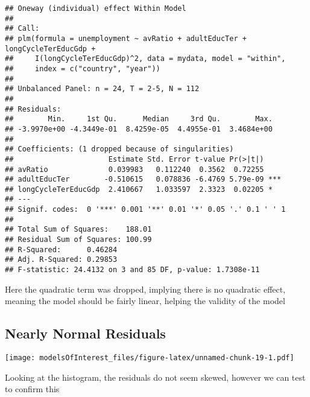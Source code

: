 \documentclass[
]{article}
\newenvironment{Shaded}{\begin{snugshade}}{\end{snugshade}}
\newcommand{\FunctionTok}[1]{\textcolor[rgb]{0.00,0.00,0.00}{#1}}
\newcommand{\NormalTok}[1]{#1}
\newcommand{\SpecialCharTok}[1]{\textcolor[rgb]{0.00,0.00,0.00}{#1}}
\begin{document}
\begin{verbatim}
## Oneway (individual) effect Within Model
## 
## Call:
## plm(formula = unemployment ~ avRatio + adultEducTer + longCycleTerEducGdp + 
##     I(longCycleTerEducGdp)^2, data = mydata, model = "within", 
##     index = c("country", "year"))
## 
## Unbalanced Panel: n = 24, T = 2-5, N = 112
## 
## Residuals:
##        Min.     1st Qu.      Median     3rd Qu.        Max. 
## -3.9970e+00 -4.3449e-01  8.4259e-05  4.4955e-01  3.4684e+00 
## 
## Coefficients: (1 dropped because of singularities)
##                      Estimate Std. Error t-value Pr(>|t|)    
## avRatio              0.039983   0.112240  0.3562  0.72255    
## adultEducTer        -0.510615   0.078836 -6.4769 5.79e-09 ***
## longCycleTerEducGdp  2.410667   1.033597  2.3323  0.02205 *  
## ---
## Signif. codes:  0 '***' 0.001 '**' 0.01 '*' 0.05 '.' 0.1 ' ' 1
## 
## Total Sum of Squares:    188.01
## Residual Sum of Squares: 100.99
## R-Squared:      0.46284
## Adj. R-Squared: 0.29853
## F-statistic: 24.4132 on 3 and 85 DF, p-value: 1.7308e-11
\end{verbatim}

Here the quadratic term was dropped, implying there is no quadratic
effect, meaning the model should be fairly linear, helping the validity
of the model

\hypertarget{nearly-normal-residuals}{%
\subsection{Nearly Normal Residuals}\label{nearly-normal-residuals}}

\begin{Shaded}
\end{Shaded}

\texttt{[image: modelsOfInterest\_files/figure-latex/unnamed-chunk-19-1.pdf]}

Looking at the histogram, the residuals do not seem skewed, however we
can test to confirm this

\begin{Shaded}
\end{Shaded}
\end{document}
